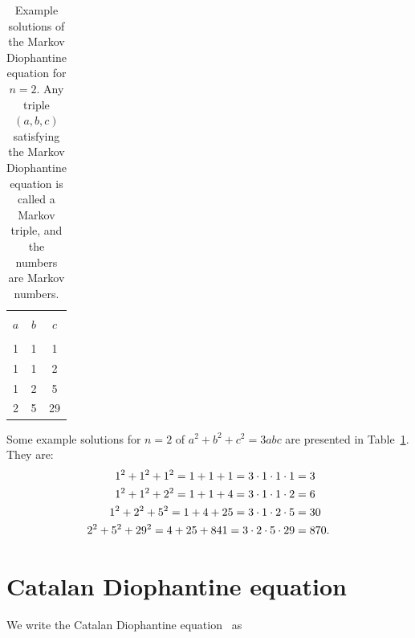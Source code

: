 \documentclass[11pt]{article}
\begin{document}
\begin{table}[!ht]
\caption{Example solutions of the Markov Diophantine equation for $n = 2$\@. Any triple 
$(a, b, c)$ satisfying the Markov Diophantine equation is called a Markov triple, and the numbers are Markov numbers.}
\label{tab:solutions}
\vspace{0.5cm}
\centering
\begin{tabular}{c c c}
\hline \hline \\ [-2.0ex]  %
$a$ & $b$ & $c$ \\[0.6ex]  %
\hline    \\[-1.5ex]  %
1 & 1 & 1 \\
1 & 1 & 2 \\
1 & 2 & 5 \\
2 & 5 & 29 \\[0.6ex]  %
\hline \hline
\end{tabular}
\end{table}
Some example solutions for $n = 2$ of $a^{2} + b^{2} + c^{2} = 3\mathit{abc}$ are presented in Table~\ref{tab:solutions}\@.
They are:
\begin{align*} 
1^{2} + 1^{2} + 1^{2} =  1 + 1 + 1 =  3 \cdot 1 \cdot 1 \cdot 1 &= 3         \\ \newline
1^{2} + 1^{2} + 2^{2} =  1 + 1 + 4 =  3 \cdot 1 \cdot 1 \cdot 2 &= 6         \\ \newline
1^{2} + 2^{2} + 5^{2} =  1 + 4 + 25 = 3 \cdot 1 \cdot 2 \cdot 5 &= 30        \\ \newline
2^{2} + 5^{2} + 29^{2} = 4 + 25 + 841 = 3 \cdot 2 \cdot 5 \cdot 29 &= 870.   
\end{align*} 






\section{Catalan Diophantine equation}\label{CatalanEquation}


We write the Catalan Diophantine 
equation~\cite{Catalan1844, mihalescu2004} as
\end{document}
